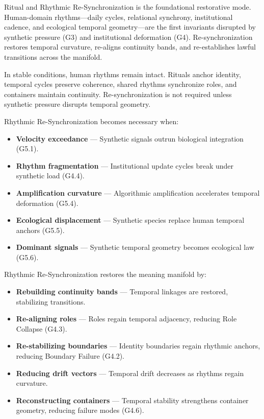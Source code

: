 \noindent Ritual and Rhythmic Re-Synchronization is the foundational restorative
mode. Human-domain rhythms—daily cycles, relational synchrony, institutional
cadence, and ecological temporal geometry—are the first invariants disrupted by
synthetic pressure (G3) and institutional deformation (G4). Re-synchronization
restores temporal curvature, re-aligns continuity bands, and re-establishes
lawful transitions across the manifold.

\medskip

\noindent In stable conditions, human rhythms remain intact. Rituals anchor
identity, temporal cycles preserve coherence, shared rhythms synchronize roles,
and containers maintain continuity. Re-synchronization is not required unless
synthetic pressure disrupts temporal geometry.

\medskip

\noindent Rhythmic Re-Synchronization becomes necessary when:

\begin{itemize}[leftmargin=1.2cm]
    \item \textbf{Velocity exceedance} — Synthetic signals outrun biological
    integration (G5.1).

    \item \textbf{Rhythm fragmentation} — Institutional update cycles break
    under synthetic load (G4.4).

    \item \textbf{Amplification curvature} — Algorithmic amplification accelerates
    temporal deformation (G5.4).

    \item \textbf{Ecological displacement} — Synthetic species replace human
    temporal anchors (G5.5).

    \item \textbf{Dominant signals} — Synthetic temporal geometry becomes
    ecological law (G5.6).
\end{itemize}

\medskip

\noindent Rhythmic Re-Synchronization restores the meaning manifold by:

\begin{itemize}[leftmargin=1.2cm]
    \item \textbf{Rebuilding continuity bands} — Temporal linkages are restored,
    stabilizing transitions.

    \item \textbf{Re-aligning roles} — Roles regain temporal adjacency, reducing
    Role Collapse (G4.3).

    \item \textbf{Re-stabilizing boundaries} — Identity boundaries regain
    rhythmic anchors, reducing Boundary Failure (G4.2).

    \item \textbf{Reducing drift vectors} — Temporal drift decreases as rhythms
    regain curvature.

    \item \textbf{Reconstructing containers} — Temporal stability strengthens
    container geometry, reducing failure modes (G4.6).
\end{itemize}


